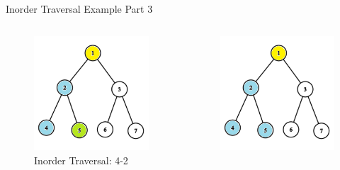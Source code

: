 \documentclass[aspectratio=169]{beamer}%
\begin{document}
\begin{frame}{Inorder Traversal Example Part 3}
    \begin{columns}
        \begin{column}{0.32\textwidth}
            \begin{figure}
                \centering
                \includegraphics[width = .9\linewidth]{tree-in 7.png}
                \caption{Inorder Traversal: 4-2}
            \end{figure}
        \end{column}
        \hfill
        \begin{column}{0.32\textwidth}
            \begin{figure}
                \centering
                \includegraphics[width = .9\linewidth]{tree-in 8.png}

\end{figure}
\end{column}
\end{columns}
\end{frame}
\end{document}
